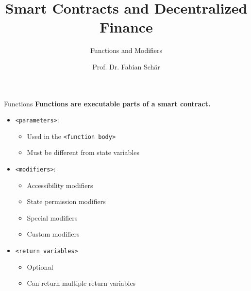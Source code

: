 \documentclass[]{beamer}
\title{Smart Contracts and Decentralized Finance}
\subtitle{Functions and Modifiers}
\author{Prof. Dr. Fabian Schär}
\institute{University of Basel}
\begin{document}
\thispagestyle{empty}
\begin{frame}[noframenumbering]
	\titlepage
\end{frame}

\begin{frame}{Functions}
	\textbf{Functions are executable parts of a smart contract.}
		
		
	\begin{itemize}
		\item<3-> \texttt{<parameters>}:
		\begin{itemize}
			\item<3-> Used in the \texttt{<function body>}
			\item<3-> Must be different from state variables	
		\end{itemize}
		\item<4-> \texttt{<modifiers>}:
		\begin{itemize}
			\item<4-> Accessibility modifiers
			\item<4-> State permission modifiers
			\item<4-> Special modifiers
			\item<4-> Custom modifiers
		\end{itemize}
		\item<5-> \texttt{<return variables>}
		\begin{itemize}
			\item<5-> Optional
			\item<5-> Can return multiple return variables
		\end{itemize}
	\end{itemize}
\end{frame}
\end{document}
